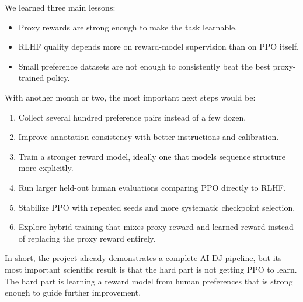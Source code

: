 \documentclass{article}
\begin{document}
We learned three main lessons:
\begin{itemize}
\item Proxy rewards are strong enough to make the task learnable.
\item RLHF quality depends more on reward-model supervision than on PPO itself.
\item Small preference datasets are not enough to consistently beat the best proxy-trained policy.
\end{itemize}

With another month or two, the most important next steps would be:
\begin{enumerate}
\item Collect several hundred preference pairs instead of a few dozen.
\item Improve annotation consistency with better instructions and calibration.
\item Train a stronger reward model, ideally one that models sequence structure more explicitly.
\item Run larger held-out human evaluations comparing PPO directly to RLHF.
\item Stabilize PPO with repeated seeds and more systematic checkpoint selection.
\item Explore hybrid training that mixes proxy reward and learned reward instead of replacing the proxy reward entirely.
\end{enumerate}

In short, the project already demonstrates a complete AI DJ pipeline, but its most important scientific result is that the hard part is not getting PPO to learn. The hard part is learning a reward model from human preferences that is strong enough to guide further improvement.
\end{document}
